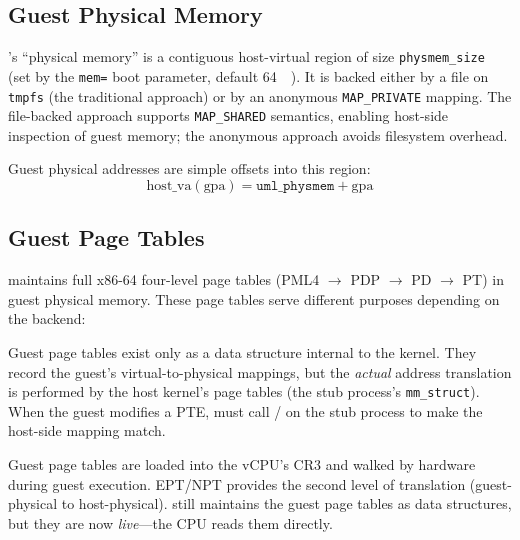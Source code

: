 \subsection{Guest Physical Memory}

\UML{}'s ``physical memory'' is a contiguous host-virtual region of
size \texttt{physmem\_size} (set by the \texttt{mem=} boot parameter,
default \SI{64}{\mebi\byte}).  It is backed either by a file on
\texttt{tmpfs} (the traditional approach) or by an anonymous
\texttt{MAP\_PRIVATE} mapping.  The file-backed approach supports
\texttt{MAP\_SHARED} semantics, enabling host-side inspection of
guest memory; the anonymous approach avoids filesystem overhead.

Guest physical addresses are simple offsets into this region:
\begin{equation*}
  \text{host\_va}(\text{gpa}) = \texttt{uml\_physmem} + \text{gpa}
\end{equation*}

\subsection{Guest Page Tables}

\UML{} maintains full x86-64 four-level page tables (PML4 $\rightarrow$
PDP $\rightarrow$ PD $\rightarrow$ PT) in guest physical memory.  These
page tables serve different purposes depending on the backend:

\begin{description}[style=nextline]
  \item[Seccomp/ptrace backends.]
    Guest page tables exist only as a data structure internal to the
    \UML{} kernel.  They record the guest's virtual-to-physical
    mappings, but the \emph{actual} address translation is performed
    by the host kernel's page tables (the stub process's
    \texttt{mm\_struct}).  When the guest modifies a PTE, \UML{} must
    call / on the stub process to
    make the host-side mapping match.

  \item[KVM backend.]
    Guest page tables are loaded into the vCPU's CR3 and walked by
    hardware during guest execution.  EPT/NPT provides the second
    level of translation (guest-physical to host-physical).  \UML{}
    still maintains the guest page tables as data structures, but
    they are now \emph{live}---the CPU reads them directly.
\end{description}

